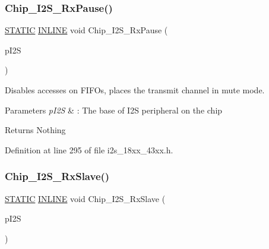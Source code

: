 \subsubsection{\texorpdfstring{Chip\+\_\+\+I2\+S\+\_\+\+Rx\+Pause()}{Chip\_I2S\_RxPause()}}
{\footnotesize\ttfamily \hyperlink{group___l_p_c___types___public___macros_ga10b2d890d871e1489bb02b7e70d9bdfb}{S\+T\+A\+T\+IC} \hyperlink{spifi__18xx__43xx_8h_a2eb6f9e0395b47b8d5e3eeae4fe0c116}{I\+N\+L\+I\+NE} void Chip\+\_\+\+I2\+S\+\_\+\+Rx\+Pause (\begin{DoxyParamCaption}\item[{\hyperlink{struct_l_p_c___i2_s___t}{L\+P\+C\+\_\+\+I2\+S\+\_\+T} $\ast$}]{p\+I2S }\end{DoxyParamCaption})}



Disables accesses on F\+I\+F\+Os, places the transmit channel in mute mode. 


\begin{DoxyParams}{Parameters}
{\em p\+I2S} & \+: The base of I2S peripheral on the chip \\
\hline
\end{DoxyParams}
\begin{DoxyReturn}{Returns}
Nothing 
\end{DoxyReturn}


Definition at line 295 of file i2s\+\_\+18xx\+\_\+43xx.\+h.

\mbox{\label{group___i2_s__18_x_x__43_x_x_ga87e2e425a4869e30c6b2561914cc6e46}} 
\subsubsection{\texorpdfstring{Chip\+\_\+\+I2\+S\+\_\+\+Rx\+Slave()}{Chip\_I2S\_RxSlave()}}
{\footnotesize\ttfamily \hyperlink{group___l_p_c___types___public___macros_ga10b2d890d871e1489bb02b7e70d9bdfb}{S\+T\+A\+T\+IC} \hyperlink{spifi__18xx__43xx_8h_a2eb6f9e0395b47b8d5e3eeae4fe0c116}{I\+N\+L\+I\+NE} void Chip\+\_\+\+I2\+S\+\_\+\+Rx\+Slave (\begin{DoxyParamCaption}\item[{\hyperlink{struct_l_p_c___i2_s___t}{L\+P\+C\+\_\+\+I2\+S\+\_\+T} $\ast$}]{p\+I2S }\end{DoxyParamCaption})}




